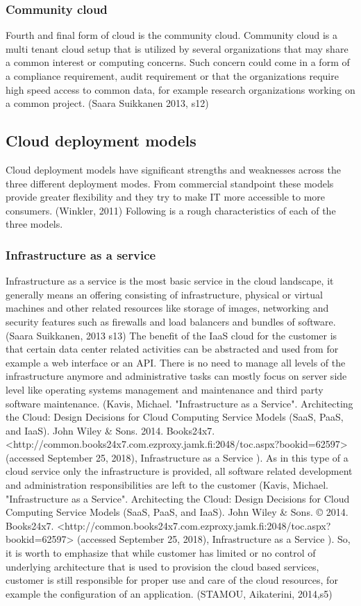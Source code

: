\documentclass{article}
\begin{document}
\subsubsection{Community cloud}
Fourth and final form of cloud is the community cloud. Community cloud is a multi tenant cloud setup that is utilized by several organizations that may share a common interest or computing concerns. Such concern could come in a form of a compliance requirement, audit requirement or that the organizations require high speed access to common data, for example research organizations working on a common project. (Saara Suikkanen 2013, s12)
\subsection{Cloud deployment models}
Cloud deployment models have significant strengths and weaknesses across the three different deployment modes. From commercial standpoint these models provide greater flexibility and they try to make IT more accessible to more consumers. (Winkler, 2011) Following is a rough characteristics of each of the three models.
\subsubsection{Infrastructure as a service}
Infrastructure as a service is the most basic service in the cloud landscape, it generally means an offering consisting of infrastructure, physical or virtual machines and other related resources like storage of images, networking and security features such as firewalls and load balancers and bundles of software. (Saara Suikkanen, 2013 s13)
The benefit of the IaaS cloud for the customer is that certain data center related activities can be abstracted and used from for example a web interface or an API. There is no need to manage all levels of the infrastructure anymore and administrative tasks can mostly focus on server side level like operating systems management and maintenance and third party software maintenance. (Kavis, Michael. "Infrastructure as a Service". Architecting the Cloud: Design Decisions for Cloud Computing Service Models (SaaS, PaaS, and IaaS). John Wiley \& Sons. 2014. Books24x7. <http://common.books24x7.com.ezproxy.jamk.fi:2048/toc.aspx?bookid=62597> (accessed September 25, 2018), Infrastructure as a Service ).
As in this type of a cloud service only the infrastructure is provided, all software related development and administration responsibilities are left to the customer (Kavis, Michael. "Infrastructure as a Service". Architecting the Cloud: Design Decisions for Cloud Computing Service Models (SaaS, PaaS, and IaaS). John Wiley \& Sons. © 2014. Books24x7. <http://common.books24x7.com.ezproxy.jamk.fi:2048/toc.aspx?bookid=62597> (accessed September 25, 2018), Infrastructure as a Service ).
So, it is worth to emphasize that while customer has limited or no control of underlying architecture that is used to provision the cloud based services, customer is still responsible for proper use and care of the cloud resources, for example the configuration of an application. (STAMOU, Aikaterini, 2014,s5)
\end{document}
